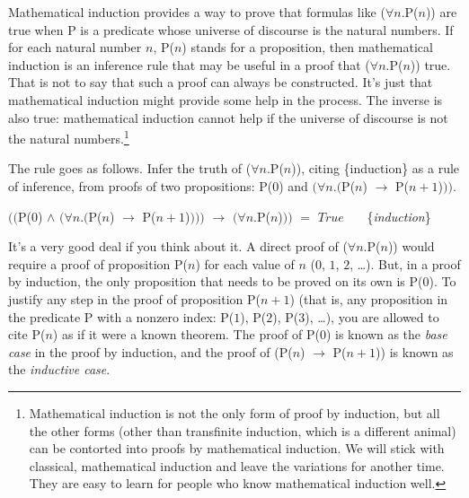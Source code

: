 Mathematical induction
provides a way to prove that
formulas like ($\forall$$n$.P($n$)) are true
when P is a predicate whose universe of discourse is the natural numbers.
If for each natural number $n$, P($n$) stands for a proposition,
then mathematical induction is an inference rule that may be useful
in a proof that ($\forall$$n$.P($n$)) true.
That is not to say that such a proof can always be constructed.
It's just that mathematical induction might provide some help in the process.
The inverse is also true: mathematical induction cannot help
if the universe of discourse is not the natural numbers.\footnote{Mathematical
induction is not the only form
of proof by induction, but all the other forms
(other than transfinite induction, which is a different animal)
can be contorted into proofs by mathematical induction.
We will stick with classical, mathematical induction
and leave the variations for another time.
They are easy to learn for people who know mathematical induction well.}

The rule goes as follows. Infer the truth of ($\forall$$n$.P($n$)),
citing \{induction\} as a rule of inference,
from proofs of two propositions:
P(0) and $(\forall n.($P($n$) $\rightarrow$ P($n+1$)$))$.
\begin{center}
$(($P($0$) $\wedge$ $(\forall n.($P($n$) $\rightarrow$ P($n+1$)$)))$ $\rightarrow$ $(\forall n.$P($n$)$))$ $=$ $True$
~~~\{\emph{induction}\}
\end{center}

It's a very good deal if you think about it.
A direct proof of ($\forall$$n$.P($n$)) would require a proof of proposition P($n$)
for each value of $n$ ($0$, $1$, $2$, \dots).
But, in a proof by induction,
the only proposition that needs to be proved on its own is P($0$).
To justify any step in the proof of proposition P($n+1$)
(that is, any proposition in the predicate P with a nonzero index:
P($1$), P($2$), P($3$), \dots),
you are allowed to cite P($n$) as if it were a known theorem.
The proof of P($0$) is known as the
\emph{base case}
in the proof by induction,
and the proof of (P($n$) $\rightarrow$ P($n+1$)) is known as the
\emph{inductive case}.

